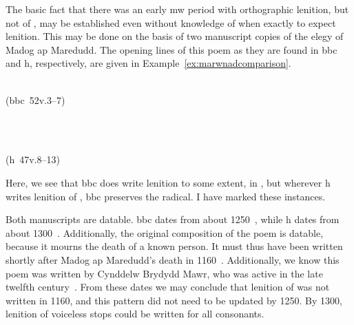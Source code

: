 The basic fact that there was an early \gls{mw} period with orthographic lenition, but not of \lT, may be established even without knowledge of when exactly to expect lenition. This may be done on the basis of two manuscript copies of the elegy of Madog ap Maredudd. The opening lines of this poem as they are found in \gls{bbc}  and \gls{h}, respectively, are given in Example~\ref{ex:marwnadcomparison}.
\begin{mwl}
\item%
  \begin{minipage}{0.45\textwidth}
    \\
    (\acrshort{bbc}~52v.3--7)
  \end{minipage}~
  \begin{minipage}{0.45\textwidth}
    \\
    (\acrshort{h}~47v.8--13)
  \end{minipage}
  \label{ex:marwnadcomparison}
\end{mwl}
Here, we see that \gls{bbc} does write lenition to some extent, \eg in , but wherever \gls{h} writes lenition of , \gls{bbc} preserves the radical. I have marked these instances.

Both manuscripts are datable. \Gls{bbc} dates from about 1250~\autocite[xxiv]{jones_rhagymadrodd_1982}, while \gls{h} dates from about 1300~\autocite{huws_llawysgrif_1981}. Additionally, the original composition of the poem is datable, because it mourns the death of a known person. It must thus have been written shortly after Madog ap Maredudd's death in 1160~\autocite[82]{jones_gwaith_1991}. Additionally, we know this poem was written by Cynddelw Brydydd Mawr, who was active in the late twelfth century~\autocite[xxx]{jones_gwaith_1991}. From these dates we may conclude that lenition of  was  not written in 1160, and this pattern did not need to be updated by 1250. By 1300, lenition of voiceless stops could be written for all consonants.

